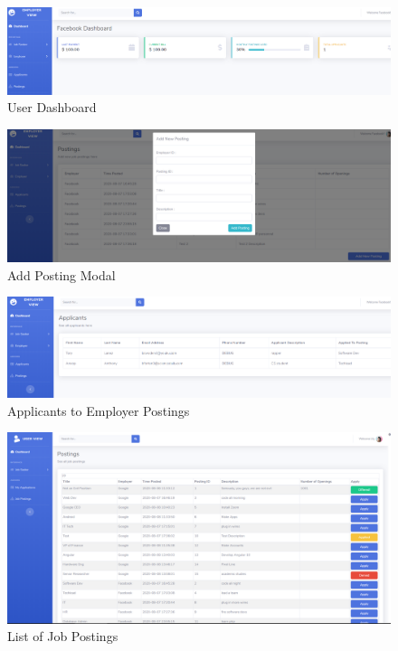 \documentclass{article}
\begin{document}
        \begin{figure}
            \centering
            \includegraphics[scale=0.25]{dashboard}
            \caption{User Dashboard}
            \label{fig:dashboard}
        \end{figure}
        \begin{figure}
            \centering
            \includegraphics[scale=0.25]{add-posting}
            \caption{Add Posting Modal}
            \label{fig:add_posting}
        \end{figure}
        \begin{figure}
            \centering
            \includegraphics[scale=0.25]{applicants}
            \caption{Applicants to Employer Postings}
            \label{fig:applicants}
        \end{figure}
        \begin{figure}
            \centering
            \includegraphics[scale=0.25]{postings}
            \caption{List of Job Postings}
            \label{fig:postings}
        \end{figure}
\end{document}
